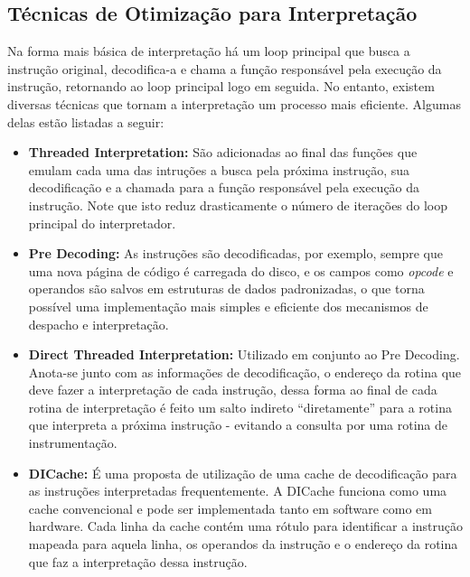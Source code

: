 \documentclass[11pt,twoside]{article}
\begin{document}
\subsection{Técnicas de Otimização para Interpretação}

Na forma mais básica de interpretação há um loop principal que busca a instrução original, decodifica-a e chama 
a função responsável pela execução da instrução, retornando ao loop principal logo em seguida. No entanto, 
existem diversas técnicas que tornam a interpretação um processo mais eficiente. Algumas delas estão listadas 
a seguir:

\begin{itemize}
 	\item \textbf{Threaded Interpretation:} São adicionadas ao final das funções que emulam cada uma das intruções a 
 	busca pela próxima instrução, sua decodificação e a chamada para a função responsável pela execução da instrução. 
 	Note que isto reduz drasticamente o número de iterações do loop principal do interpretador.

 	\item \textbf{Pre Decoding:} As instruções são decodificadas, por exemplo, sempre que uma nova página de código é 
 	carregada do disco, e os campos como \emph{opcode} e operandos são salvos em estruturas de dados padronizadas, o 
 	que torna possível uma implementação mais simples e eficiente dos mecanismos de despacho e interpretação. 
 	
 	\item \textbf{Direct Threaded Interpretation:} Utilizado em conjunto ao Pre Decoding. Anota-se junto com
 	as informações de decodificação, o endereço da rotina que deve fazer a interpretação de cada instrução, dessa forma
 	ao final de cada rotina de interpretação é feito um salto indireto ``diretamente'' para a rotina que interpreta a
 	próxima instrução - evitando a consulta por uma rotina de instrumentação.  

	\item \textbf{DICache:} É uma proposta de utilização de uma cache de decodificação para as instruções interpretadas
	frequentemente. A DICache \cite{dicache} funciona como uma cache convencional e pode ser implementada tanto em software como em 
	hardware. Cada linha da cache contém uma rótulo para identificar a instrução mapeada para aquela linha, os operandos
	da instrução e o endereço da rotina que faz a interpretação dessa instrução.
\end{itemize}
\end{document}
